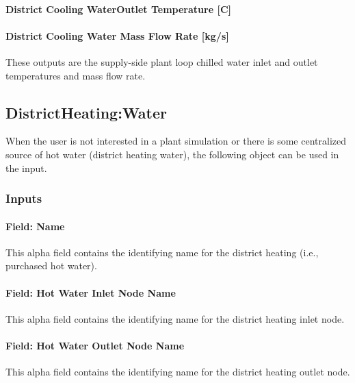 \paragraph{District Cooling WaterOutlet Temperature {[}C{]}}\label{district-cooling-outlet-temperature-c}

\paragraph{District Cooling Water Mass Flow Rate {[}kg/s{]}}\label{district-cooling-mass-flow-rate-kgs}

These outputs are the supply-side plant loop chilled water inlet and outlet temperatures and mass flow rate.

\subsection{DistrictHeating:Water}\label{districtheating}

When the user is not interested in a plant simulation or there is some centralized source of hot water (district heating water), the following object can be used in the input.

\subsubsection{Inputs}\label{inputs-17-006}

\paragraph{Field: Name}\label{field-name-16-006}

This alpha field contains the identifying name for the district heating (i.e., purchased hot water).

\paragraph{Field: Hot Water Inlet Node Name}\label{field-hot-water-inlet-node-name-2}

This alpha field contains the identifying name for the district heating inlet node.

\paragraph{Field: Hot Water Outlet Node Name}\label{field-hot-water-outlet-node-name-2}

This alpha field contains the identifying name for the district heating outlet node.

